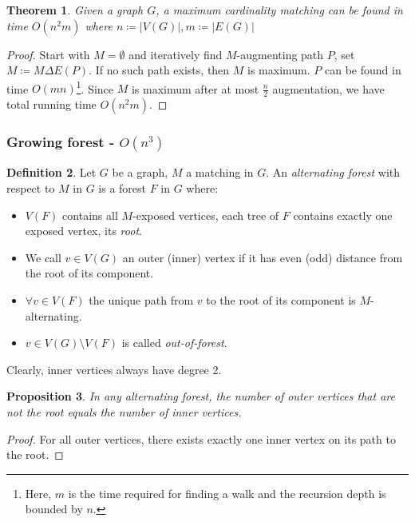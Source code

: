 \documentclass[11pt, a4paper]{article}
\newcommand{\abs}[1]{\left\lvert#1\right\rvert}
\newtheorem{theorem}{Theorem}[section]
\newtheorem{prop}[theorem]{Proposition}
\theoremstyle{remark}
\theoremstyle{definition}
\newtheorem{definition}[theorem]{Definition}
\begin{document}
\begin{theorem}
Given a graph $G$, a maximum cardinality matching can be found in time
$O(n^2m)$ where $n\coloneqq\abs{V(G)}, m\coloneqq\abs{E(G)}$
\end{theorem}
\begin{proof}
Start with $M=\emptyset$ and iteratively find $M$-augmenting path $P$,
set $M\coloneqq M\Delta E(P)$. If no such path exists, then $M$ is
maximum. $P$ can be found in time $O(mn)$\footnote{
	Here, $m$ is the time required for finding a walk and the recursion
	depth is bounded by $n$.
}. Since $M$ is maximum after at most $\frac{n}{2}$ augmentation, we have
total running time $O(n^2m)$.
\end{proof}


\subsubsection{Growing forest\texorpdfstring{ - $O(n^3)$}{}}
\begin{definition}
Let $G$ be a graph, $M$ a matching in $G$. An \emph{alternating forest}
with respect to $M$ in $G$ is a forest $F$ in $G$ where:
\begin{itemize}
	\item $V(F)$ contains all $M$-exposed vertices, each tree of $F$
	contains exactly one exposed vertex, its \emph{root}.
	\item We call $v\in V(G)$ an outer (inner) vertex if it has even
	(odd) distance from the root of its component.
	\item $\forall v\in V(F)$ the unique path from $v$ to the root of
	its component is $M$-alternating.
	\item $v\in V(G)\setminus V(F)$ is called \emph{out-of-forest}.
\end{itemize}
Clearly, inner vertices always have degree 2.
\end{definition}

\begin{prop}
In any alternating forest, the number of outer vertices that are not the
root equals the number of inner vertices.
\end{prop}
\begin{proof}
For all outer vertices, there exists exactly one inner vertex on its path
to the root.
\end{proof}
\end{document}
